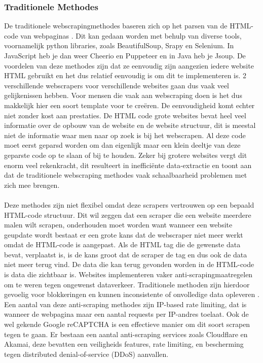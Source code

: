 \subsubsection{Traditionele Methodes}
\label{sec:Traditionele Methodes}
De traditionele webscrapingmethodes baseren zich op het parsen van de HTML-code van webpaginas \autocite{DeSSirisuriya2015}.
Dit kan gedaan worden met behulp van diverse tools, voornamelijk python libraries, zoals BeautifulSoup, Srapy en Selenium.
In JavaScript heb je dan weer Cheerio en Puppeteer en in Java heb je Jsoup. De voordelen van deze methodes zijn
dat ze eenvoudig zijn aangezien iedere website HTML gebruikt en het dus relatief eenvoudig is om dit te implementeren is. 2 verschillende webscrapers voor 
verschillende websites gaan dus vaak veel gelijkenissen hebben. Voor mensen die vaak aan webscraping doen is het dus makkelijk hier een soort template voor te creëren.
De eenvoudigheid komt echter niet zonder kost aan prestaties. De HTML code grote websites bevat heel veel informatie over de opbouw van de website en de website structuur, dit 
is meestal niet de informatie waar men naar op zoek is bij het webscrapen. Al deze code moet eerst geparsd worden om dan eigenlijk maar een klein deeltje van deze geparste code 
op te slaan of bij te houden. Zeker bij grotere websites vergt dit enorm veel rekenkracht, dit resulteert in inefficiënte data-extractie en toont aan dat de traditionele webscraping methodes
vaak schaalbaarheid problemen met zich mee brengen.
\\
\\
Deze methodes zijn niet flexibel omdat deze scrapers vertrouwen op een bepaald HTML-code structuur. Dit wil zeggen dat een scraper die een website meerdere malen wilt scrapen,
onderhouden moet worden want wanneer een website geupdate wordt bestaat er een grote kans dat de webscraper niet meer werkt omdat de HTML-code is aangepast. Als de HTML tag
die de gewenste data bevat, verplaatst is, is de kans groot dat de scraper de tag en dus ook de data niet meer terug vind. De data die kan terug gevonden worden in de HTML-code
is data die zichtbaar is. Websites implementeren vaker anti-scrapingmaatregelen om te weren tegen ongewenst dataverkeer. Traditionele methoden zijn hierdoor gevoelig voor blokkeringen
en kunnen inconsistente of onvolledige data opleveren \autocite{Sandeep2022}. Een aantal van deze anti-scraping methodes zijn IP-based rate limiting, dat is wanneer de webpagina maar een aantal requests per IP-andres 
toelaat. Ook de wel gekende Google reCAPTCHA is een effectieve manier om dit soort scrapen tegen te gaan. Er bestaan een aantal anti-scraping services zoals Cloudflare en Akamai, deze bevatten
een veiligheids features, rate limiting, en bescherming tegen distributed denial-of-service (DDoS) aanvallen.

